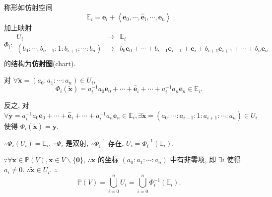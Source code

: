 \documentclass{ctexart}
\begin{document}
称形如仿射空间
\[\mathbb{E}_i=\boldsymbol{e}_i+\left<\boldsymbol{e}_0,\cdots,\widehat{\boldsymbol{e}}_i,\cdots,\boldsymbol{e}_n\right>\]
加上映射
\[\Phi_i:\begin{array}{rcl}
    U_i & \to & \mathbb{E}_i \\
    (b_0:\cdots:b_{n-1}:1:b_{i+1}:\cdots:b_n) & \to & b_0\boldsymbol{e}_0+\cdots+b_{i-1}\boldsymbol{e}_{i-1}+\boldsymbol{e}_i+b_{i+1}\boldsymbol{e}_{i+1}+\cdots+b_n\boldsymbol{e}_n \\
\end{array}\]
的结构为\textbf{仿射图}(chart).

对 $\forall\tilde{\boldsymbol{x}}=(a_0:a_1:\cdots:a_n)\in U_i$,
\[\Phi_i(\tilde{\boldsymbol{x}})=a_i^{-1}a_0\boldsymbol{e}_0+\cdots+\widehat{\boldsymbol{e}}_i+\cdots+a_i^{-1}a_n\boldsymbol{e}_n\in\mathbb{E}_i.\]

反之, 对 $\forall\boldsymbol{y}=a_i^{-1}a_0\boldsymbol{e}_0+\cdots+\widehat{\boldsymbol{e}}_i+\cdots+a_i^{-1}a_n\boldsymbol{e}_n\in\mathbb{E}_i,\exists\tilde{\boldsymbol{x}}=(a_0:\cdots:a_{i-1}:1:a_{i+1}:\cdots:a_n)\in U_i$ 使得 $\Phi_i(\tilde{\boldsymbol{x}})=\boldsymbol{y}$.

$\therefore\Phi_i(U_i)=\mathbb{E}_i$. $\because\Phi_i$ 是双射, $\therefore\Phi_i^{-1}$ 存在, $U_i=\Phi_i^{-1}(\mathbb{E}_i)$.

$\because\forall\tilde{\boldsymbol{x}}\in\mathbb{P}(V),\boldsymbol{x}\in V\backslash\{\boldsymbol{0}\}$, $\therefore\tilde{\boldsymbol{x}}$ 的坐标 $(a_0:a_1:\cdots:a_n)$ 中有非零项, 即 $\exists i$ 使得 $a_i\neq0$. $\therefore\tilde{\boldsymbol{x}}\in U_i$. $\therefore$
\[\mathbb{P}(V)=\bigcup\limits_{i=0}^nU_i=\bigcup\limits_{i=0}^n\Phi_i^{-1}(\mathbb{E}_i).\]
\end{document}
